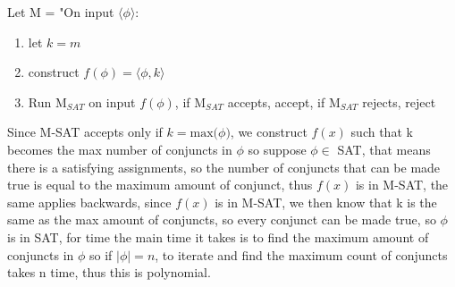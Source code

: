\documentclass[a4paper,addpoints
	]{exam}
\begin{document}
\begin{questions}
\begin{solutionbox}{}
    \vspace{2em}

    Let M = "On input $\langle \phi \rangle$:
    \begin{enumerate}
        \item let $k = m$
        \item construct $f(\phi)=\langle\phi,k\rangle$
        \item Run $\text{M}_{SAT}$ on input $f(\phi)$, if $\text{M}_{SAT}$ accepts, accept, if $\text{M}_{SAT}$ rejects, reject
    \end{enumerate}

    \vspace{2em}

    Since M-SAT accepts only if $k= \text{max($\phi$)}$, we construct $f(x)$ such that k becomes the max number of conjuncts in $\phi$ so suppose $\phi\in$ SAT, that means there is a satisfying assignments, so the number of conjuncts that can be made true is equal to the maximum amount of conjunct, thus $f(x)$ is in M-SAT, the same applies backwards, since $f(x)$ is in M-SAT, we then know that k is the same as the max amount of conjuncts, so every conjunct can be made true, so $\phi$ is in SAT, for time the main time it takes is to find the maximum amount of conjuncts in $\phi$ so if $|\phi|=n$, to iterate and find the maximum count of conjuncts takes n time, thus this is polynomial.
    
        
    \end{solutionbox}
\end{questions}
\pagebreak
\end{document}
